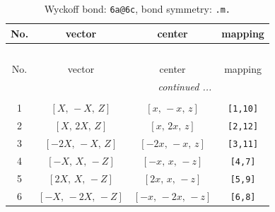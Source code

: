 \documentclass[fleqn,8pt]{jsarticle}
\begin{document}
\begin{longtable}{cccc}
\caption{Wyckoff bond: {\tt 6a@6c}, bond symmetry: {\tt .m.}}
 \\
 \hline \hline
No. & vector & center & mapping \\ \hline \endfirsthead

\multicolumn{3}{l}{\tablename\ \thetable{}} \\
 \hline \hline
No. & vector & center & mapping \\ \hline \endhead

 \hline \hline
\multicolumn{3}{r}{\footnotesize\it continued ...} \\ \endfoot

 \hline \hline
\multicolumn{3}{r}{} \\ \endlastfoot

1 & $\left[ X,\, - X,\, Z \right]$ & $\left[ x,\, - x,\, z \right]$ & {\tt [1,10]} \\ \hline
2 & $\left[ X,\, 2 X,\, Z \right]$ & $\left[ x,\, 2 x,\, z \right]$ & {\tt [2,12]} \\ \hline
3 & $\left[ - 2 X,\, - X,\, Z \right]$ & $\left[ - 2 x,\, - x,\, z \right]$ & {\tt [3,11]} \\ \hline
4 & $\left[ - X,\, X,\, - Z \right]$ & $\left[ - x,\, x,\, - z \right]$ & {\tt [4,7]} \\ \hline
5 & $\left[ 2 X,\, X,\, - Z \right]$ & $\left[ 2 x,\, x,\, - z \right]$ & {\tt [5,9]} \\ \hline
6 & $\left[ - X,\, - 2 X,\, - Z \right]$ & $\left[ - x,\, - 2 x,\, - z \right]$ & {\tt [6,8]} \\
\end{longtable}
\renewcommand{\arraystretch}{1.2}
\end{document}
